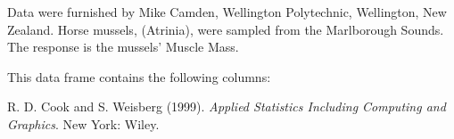 \begin{Description}\relax
Data were furnished by Mike Camden, Wellington Polytechnic, Wellington,
New Zealand.  Horse mussels, (Atrinia), were sampled from the Marlborough
Sounds.  The response is the mussels' Muscle Mass.\end{Description}
\begin{Format}\relax
This data frame contains the following columns:
\end{Format}
\begin{Details}\relax
\end{Details}
\begin{Source}\relax
R. D. Cook and S. Weisberg (1999). \emph{Applied
Statistics Including Computing and Graphics}.  New York:  Wiley.\end{Source}

